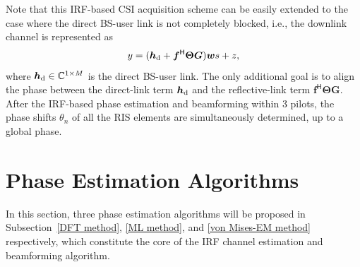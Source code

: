 \documentclass[journal,twocolumn]{IEEEtran}
\theoremstyle{nonumberplain}
\def \H {^{\mathsf{H}}}
\begin{document}
    Note that this IRF-based CSI acquisition scheme can be easily extended to the case where the direct BS-user link is not completely blocked, i.e., the downlink channel is represented as 
    \begin{equation}
        y = ({\bm h}_{\rm d} + {\bm f}\H {\bm \Theta}{\bm G}){\bm w}s + z,
    \end{equation}
    where ${\bm h}_{\rm d}\in\mathbb{C}^{1\times M}$ is the direct BS-user link. 
    The only additional goal is to align the phase between the direct-link term ${\bm h}_{\rm d}$ and the reflective-link term ${\bm f}\H {\bm \Theta}{\bm G}$. 
    After the IRF-based phase estimation and beamforming within 3 pilots, the phase shifts $\theta_n$ of all the RIS elements are simultaneously determined, up to a global phase.  

    
\section{Phase Estimation Algorithms}
In this section, three phase estimation algorithms will be proposed in Subsection~\ref{DFT method}, \ref{ML method}, and \ref{von Mises-EM method} respectively, which constitute the core of the \ac{IRF} channel estimation and beamforming algorithm.
\end{document}
